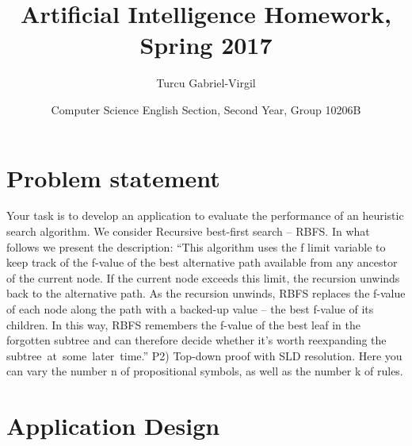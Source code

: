 \documentclass{article}
\begin{document}

\title{Artificial Intelligence Homework, Spring 2017}
\author{Turcu Gabriel-Virgil }
\date{Computer Science English Section, Second Year, Group 10206B}
\maketitle
\pagebreak



\section{Problem statement}

Your task is to develop an application to evaluate the performance of an heuristic
search algorithm.
We consider Recursive best-first search – RBFS. In what follows we present
the description:
“This algorithm uses the f limit variable to keep track of the f-value of the
best alternative path available from any ancestor of the current node. If the
current node exceeds this limit, the recursion unwinds back to the alternative
path. As the recursion unwinds, RBFS replaces the f-value of each node along
the path with a backed-up value – the best f-value of its children. In this way,
RBFS remembers the f-value of the best leaf in the forgotten subtree and can
therefore decide whether it’s worth reexpanding the \mbox{subtree at some later time.}”
\linebreak
\linebreak
P2) Top-down proof with SLD resolution. Here you can vary the number n of
propositional symbols, as well as the number k of rules.

\pagebreak

\linebreak


\section{Application Design}
\end{document}
